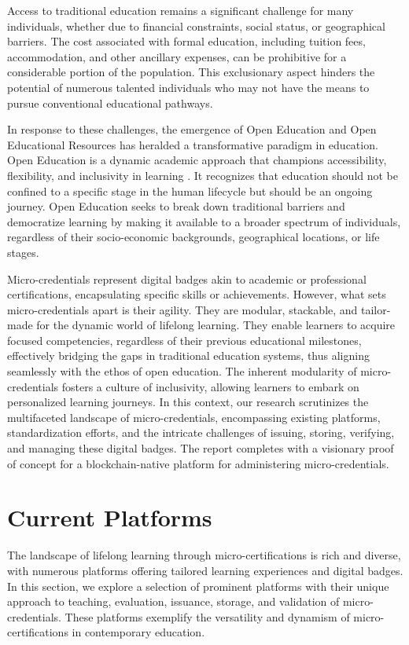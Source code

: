 \documentclass{article}
\begin{document}
\begin{multicols}{2}
    Access to traditional education remains a significant challenge for many individuals, whether due to financial constraints, social status, or geographical barriers. The cost associated with formal education, including tuition fees, accommodation, and other ancillary expenses, can be prohibitive for a considerable portion of the population. This exclusionary aspect hinders the potential of numerous talented individuals who may not have the means to pursue conventional educational pathways.

    In response to these challenges, the emergence of Open Education and Open Educational Resources has heralded a transformative paradigm in education. Open Education is a dynamic academic approach that champions accessibility, flexibility, and inclusivity in learning \cite{Blessinger2016Open}. It recognizes that education should not be confined to a specific stage in the human lifecycle but should be an ongoing journey. Open Education seeks to break down traditional barriers and democratize learning by making it available to a broader spectrum of individuals, regardless of their socio-economic backgrounds, geographical locations, or life stages.

    Micro-credentials represent digital badges akin to academic or professional certifications, encapsulating specific skills or achievements. However, what sets micro-credentials apart is their agility. They are modular, stackable, and tailor-made for the dynamic world of lifelong learning. They enable learners to acquire focused competencies, regardless of their previous educational milestones, effectively bridging the gaps in traditional education systems, thus aligning seamlessly with the ethos of open education. The inherent modularity of micro-credentials fosters a culture of inclusivity, allowing learners to embark on personalized learning journeys. In this context, our research scrutinizes the multifaceted landscape of micro-credentials, encompassing existing platforms, standardization efforts, and the intricate challenges of issuing, storing, verifying, and managing these digital badges. The report completes with a visionary proof of concept for a blockchain-native platform for administering micro-credentials.

    \section{Current Platforms}
    The landscape of lifelong learning through micro-certifications is rich and diverse, with numerous platforms offering tailored learning experiences and digital badges. In this section, we explore a selection of prominent platforms with their unique approach to teaching, evaluation, issuance, storage, and validation of micro-credentials. These platforms exemplify the versatility and dynamism of micro-certifications in contemporary education.


\end{multicols}
\end{document}
